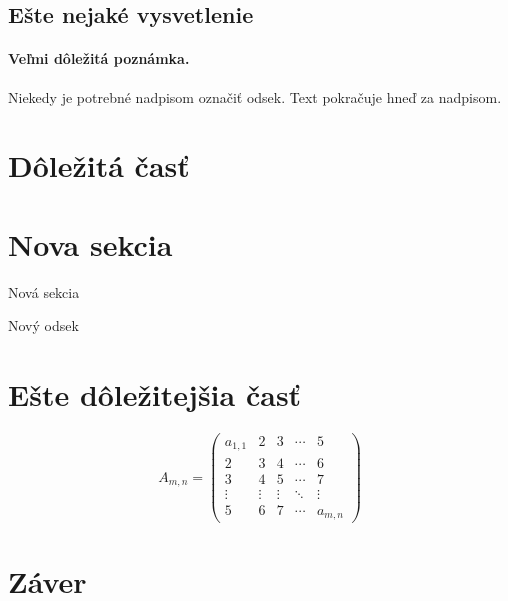 \documentclass[10pt,twocolumn,slovak,a4paper]{article}
\begin{document}
\subsection{Ešte nejaké vysvetlenie} \label{ina:este}

\paragraph{Veľmi dôležitá poznámka.}
Niekedy je potrebné nadpisom označiť odsek. Text pokračuje hneď za nadpisom.



\section{Dôležitá časť} \label{dolezita}

\section{Nova sekcia}

Nová sekcia

Nový odsek



\section{Ešte dôležitejšia časť} \label{dolezitejsia}

\begin{displaymath}
A_{m,n} =
\begin{pmatrix}
	a_{1,1} & 2 & 3 & \cdots & 5 \\
	2 & 3 & 4 & \cdots & 6 \\
	3 & 4 & 5 & \cdots & 7 \\
	\vdots &\vdots & \vdots & \ddots & \vdots \\
	5 & 6 & 7 & \cdots & a_{m,n}
\end{pmatrix}
\end{displaymath}


\section{Záver} \label{zaver} %






\end{document}
